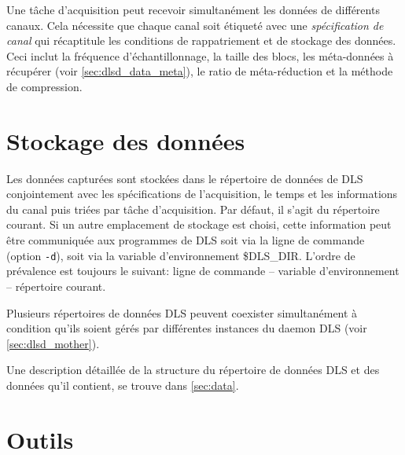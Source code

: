 \documentclass[a4paper,12pt,BCOR6mm,bibtotoc,idxtotoc]{scrbook}
\begin{document}
Une t\^ache d'acquisition peut recevoir simultan\'ement les donn\'ees
de diff\'erents canaux.  Cela n\'ecessite que chaque canal soit
\'etiquet\'e avec une \textit{sp\'ecification de canal} qui r\'ecaptitule les conditions de rappatriement et
de stockage des donn\'ees.  Ceci inclut la fr\'equence
d'\'echantillonnage, la taille des blocs, les m\'eta-donn\'ees \`a
r\'ecup\'erer (voir \autoref{sec:dlsd_data_meta}), le ratio de
m\'eta-r\'eduction et la m\'ethode de compression.


\section{Stockage des donn\'ees}
\label{sec:allg_ablage}

Les donn\'ees captur\'ees sont stock\'ees dans le r\'epertoire de
donn\'ees de DLS conjointement avec les
sp\'ecifications de l'acquisition, le temps et les informations du
canal puis tri\'ees par t\^ache d'acquisition. Par d\'efaut, il s'agit
du r\'epertoire courant. Si un autre emplacement de stockage est
choisi, cette information peut \^etre communiqu\'ee aux programmes de
DLS soit via la ligne de commande (option \texttt{-d}), soit via la
variable d'environnement \$DLS\_DIR.  L'ordre de
pr\'evalence est toujours le suivant: ligne de commande -- variable
d'environnement -- r\'epertoire courant.

Plusieurs r\'epertoires de donn\'ees DLS peuvent coexister
simultan\'ement \`a condition qu'ils soient g\'er\'es par
diff\'erentes instances du daemon DLS (voir
\autoref{sec:dlsd_mother}).

Une description d\'etaill\'ee de la structure du r\'epertoire de
donn\'ees DLS et des donn\'ees qu'il contient, se trouve dans
\autoref{sec:data}.


\section{Outils}
\label{sec:allg_tools}
\end{document}
